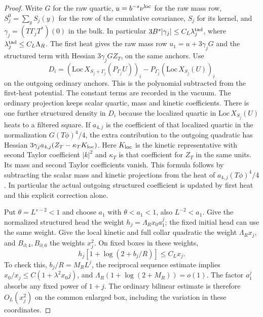 \documentclass[11pt]{article}
\theoremstyle{definition}
\begin{document}
\begin{proof}
Write \(G\) for the raw quartic, \(u=b^{-s}\nu^{\rm loc}\) for the
raw mass row, \(S_j^0=\sum_y S_j(y)\) for the row of the cumulative
covariance, \(S_j\) for its kernel, and
\(\gamma_j=(T\Gamma_jT^*)(0)\) in the bulk. In particular
\(3B^s|\gamma_j|\le C_L\lambda_j^{\rm tad}\),
where \(\lambda_j^{\rm tad}\le C_L\Lambda_R\).
The first heat gives the raw mass row
\(u_1=u+3\gamma_jG\) and the structured term with Hessian
\(3\gamma_jG Z_T\), on the same anchors. Use
\begin{equation}
 D_i=(\mathrm{Loc}\,X_{S_j+\Gamma_j}(P_{\Gamma_j}U))_i
                    -P_{\Gamma_j}(\mathrm{Loc}\,X_{S_j}(U))_i
\end{equation}
on the outgoing ordinary anchors. This is the polynomial subtracted
from the first-heat potential. The constant terms are recorded in
the vacuum. The ordinary projection keeps scalar quartic, mass and
kinetic coefficients. There is one further structured density
in \(D_i\) because the localized quartic in
\(\mathrm{Loc}\,X_{S_j}(U)\) heats to a filtered square.
If \(a_{4,j}\) is the coefficient of that localized quartic in
the normalization \(G(T\phi)^4/4\), the extra contribution to
the outgoing quadratic has Hessian
\(3\gamma_j a_{4,j}(Z_T-\kappa_T K_{\rm loc})\).
Here \(K_{\rm loc}\) is the kinetic representative with
second Taylor coefficient \(|k|^2\) and \(\kappa_T\) is that
coefficient for \(Z_T\) in the same units.
Its mass and second Taylor coefficients vanish. This formula follows
by subtracting the scalar mass and kinetic projections from the heat
of \(a_{4,j}(T\phi)^4/4\). In particular the actual outgoing
structured coefficient is updated by first heat and this explicit
correction alone.

Put \(\theta=L^{s-2}<1\) and choose \(a_1\) with
\(\theta<a_1<1\), also \(L^{-2}<a_1\). Give the normalized
structured head the weight \(h_j=\Lambda_R x_0 a_1^j\); the fixed
initial head can use the same weight. Give the local kinetic and
full collar quadratic the weight \(\Lambda_Rx_j\), and
\(B_{\partial,4},B_{\partial,6}\) the weights \(x_j^2\).
On fixed boxes in these weights,
\begin{equation}
 h_j[1+\log(2+b_j/R)]\le C_Lx_j .
\end{equation}
To check this, \(b_j/R=M_RL^j\), the reciprocal sequence estimate
implies \(x_0/x_j\le C(1+\lambda^2x_0j)\), and
\(\Lambda_R(1+\log(2+M_R))=o(1)\). The factor \(a_1^j\)
absorbs any fixed power of \(1+j\). The ordinary bilinear estimate
is therefore \(O_L(x_j^2)\) on the common enlarged box,
including the variation in these coordinates.


\end{proof}
\end{document}
